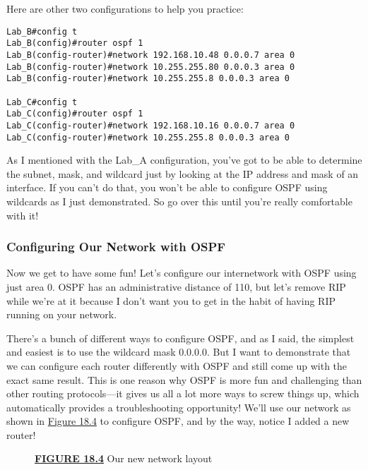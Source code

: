 Here are other two configurations to help you practice:

\begin{verbatim}
Lab_B#config t
Lab_B(config)#router ospf 1
Lab_B(config-router)#network 192.168.10.48 0.0.0.7 area 0
Lab_B(config-router)#network 10.255.255.80 0.0.0.3 area 0
Lab_B(config-router)#network 10.255.255.8 0.0.0.3 area 0
 
Lab_C#config t
Lab_C(config)#router ospf 1
Lab_C(config-router)#network 192.168.10.16 0.0.0.7 area 0
Lab_C(config-router)#network 10.255.255.8 0.0.0.3 area 0
\end{verbatim}

As I mentioned with the Lab\_A configuration, you've got to be able to
determine the subnet, mask, and wildcard just by looking at the IP
address and mask of an interface. If you can't do that, you won't be
able to configure OSPF using wildcards as I just demonstrated. So go
over this until you're really comfortable with it!

\subsubsection[Configuring Our Network with
OSPF]{\texorpdfstring{\protect\hypertarget{c18.xhtmlux5cux23c18-sec-8}{}{}Configuring
Our Network with OSPF}{Configuring Our Network with OSPF}}

Now we get to have some fun! Let's configure our internetwork with OSPF
using just area 0. OSPF has an administrative distance of 110, but let's
remove RIP while we're at it because I don't want you to get in the
habit of having RIP running on your network.

There's a bunch of different ways to configure OSPF, and as I said, the
simplest and easiest is to use the wildcard mask 0.0.0.0. But I want to
demonstrate that we can configure each router differently with OSPF and
still come up with the exact same result. This is one reason why OSPF is
more fun and challenging than other routing protocols---it gives us all
a lot more ways to screw things up, which automatically provides
\protect\hypertarget{c18.xhtmlux5cux23Page_758}{}{}a troubleshooting
opportunity! We'll use our network as shown in
\protect\hyperlink{c18.xhtmlux5cux23figure18-4}{Figure 18.4} to
configure OSPF, and by the way, notice I added a new router!

\begin{figure}
\centering
\caption{{\protect\hyperlink{c18.xhtmlux5cux23figureanchor18-4}{\textbf{FIGURE
18.4}} Our new network layout}}
\end{figure}

